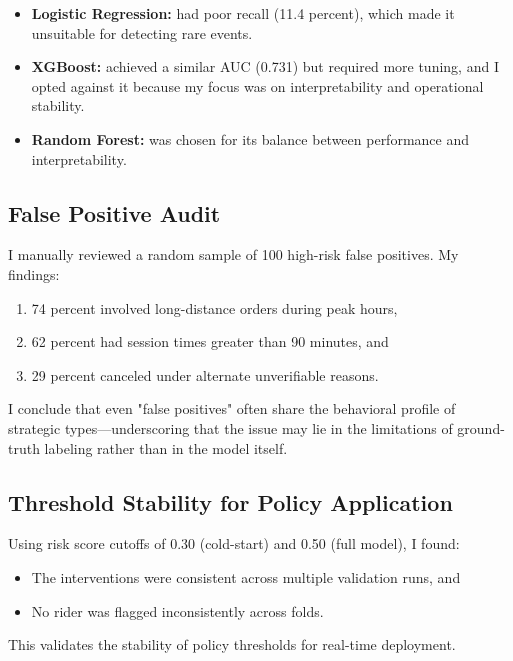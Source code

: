 \documentclass[12pt,letterpaper]{article}
\begin{document}
\begin{itemize}
    \item \textbf{Logistic Regression:} had poor recall (11.4 percent), which made it unsuitable for detecting rare events.
    \item \textbf{XGBoost:} achieved a similar AUC (0.731) but required more tuning, and I opted against it because my focus was on interpretability and operational stability.
    \item \textbf{Random Forest:} was chosen for its balance between performance and interpretability.
\end{itemize}

\subsection{False Positive Audit}

I manually reviewed a random sample of 100 high-risk false positives. My findings:

\begin{enumerate}
    \item 74 percent involved long-distance orders during peak hours,
    \item 62 percent had session times greater than 90 minutes, and
    \item 29 percent canceled under alternate unverifiable reasons.
\end{enumerate}

I conclude that even "false positives" often share the behavioral profile of strategic types—underscoring that the issue may lie in the limitations of ground-truth labeling rather than in the model itself.

\subsection{Threshold Stability for Policy Application}

Using risk score cutoffs of 0.30 (cold-start) and 0.50 (full model), I found:

\begin{itemize}
    \item The interventions were consistent across multiple validation runs, and
    \item No rider was flagged inconsistently across folds.
\end{itemize}

This validates the stability of policy thresholds for real-time deployment.
\end{document}
